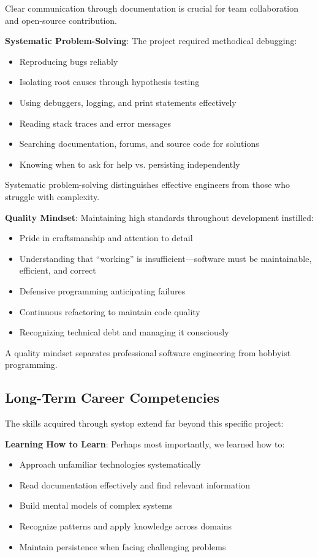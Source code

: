 \documentclass[12pt,a4paper,oneside]{report}
\begin{document}
Clear communication through documentation is crucial for team collaboration and open-source contribution.

\textbf{Systematic Problem-Solving}: The project required methodical debugging:

\begin{itemize}
    \item Reproducing bugs reliably
    \item Isolating root causes through hypothesis testing
    \item Using debuggers, logging, and print statements effectively
    \item Reading stack traces and error messages
    \item Searching documentation, forums, and source code for solutions
    \item Knowing when to ask for help vs. persisting independently
\end{itemize}

Systematic problem-solving distinguishes effective engineers from those who struggle with complexity.

\textbf{Quality Mindset}: Maintaining high standards throughout development instilled:

\begin{itemize}
    \item Pride in craftsmanship and attention to detail
    \item Understanding that ``working'' is insufficient---software must be maintainable, efficient, and correct
    \item Defensive programming anticipating failures
    \item Continuous refactoring to maintain code quality
    \item Recognizing technical debt and managing it consciously
\end{itemize}

A quality mindset separates professional software engineering from hobbyist programming.

\subsection{Long-Term Career Competencies}

The skills acquired through systop extend far beyond this specific project:

\textbf{Learning How to Learn}: Perhaps most importantly, we learned how to:
\begin{itemize}
    \item Approach unfamiliar technologies systematically
    \item Read documentation effectively and find relevant information
    \item Build mental models of complex systems
    \item Recognize patterns and apply knowledge across domains
    \item Maintain persistence when facing challenging problems
\end{itemize}
\end{document}
